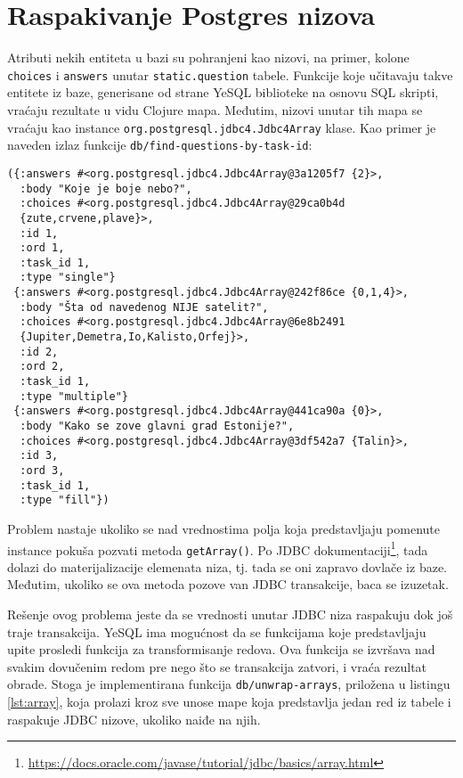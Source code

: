{\section{Raspakivanje Postgres nizova}
Atributi nekih entiteta u bazi su pohranjeni kao nizovi, na primer, kolone \texttt{choices} i \texttt{answers} unutar \texttt{static.question} tabele. Funkcije koje učitavaju takve entitete iz baze, generisane od strane YeSQL biblioteke na osnovu SQL skripti, vraćaju rezultate u vidu Clojure mapa. Međutim, nizovi unutar tih mapa se vraćaju kao instance \texttt{org.postgresql.jdbc4.Jdbc4Array} klase. Kao primer je naveden izlaz funkcije \texttt{db/find-questions-by-task-id}:
\begin{verbatim}
({:answers #<org.postgresql.jdbc4.Jdbc4Array@3a1205f7 {2}>,
  :body "Koje je boje nebo?",
  :choices #<org.postgresql.jdbc4.Jdbc4Array@29ca0b4d
  {zute,crvene,plave}>,
  :id 1,
  :ord 1,
  :task_id 1,
  :type "single"}
 {:answers #<org.postgresql.jdbc4.Jdbc4Array@242f86ce {0,1,4}>,
  :body "Šta od navedenog NIJE satelit?",
  :choices #<org.postgresql.jdbc4.Jdbc4Array@6e8b2491
  {Jupiter,Demetra,Io,Kalisto,Orfej}>,
  :id 2,
  :ord 2,
  :task_id 1,
  :type "multiple"}
 {:answers #<org.postgresql.jdbc4.Jdbc4Array@441ca90a {0}>,
  :body "Kako se zove glavni grad Estonije?",
  :choices #<org.postgresql.jdbc4.Jdbc4Array@3df542a7 {Talin}>,
  :id 3,
  :ord 3,
  :task_id 1,
  :type "fill"})
\end{verbatim}
Problem nastaje ukoliko se nad vrednostima polja koja predstavljaju pomenute instance pokuša pozvati metoda \texttt{getArray()}. Po JDBC dokumentaciji\footnote{\url{https://docs.oracle.com/javase/tutorial/jdbc/basics/array.html}}, tada dolazi do materijalizacije elemenata niza, tj. tada se oni zapravo dovlače iz baze. Međutim, ukoliko se ova metoda pozove van JDBC transakcije, baca se izuzetak.


Rešenje ovog problema jeste da se vrednosti unutar JDBC niza raspakuju dok još traje transakcija. YeSQL ima mogućnost da se funkcijama koje predstavljaju upite prosledi funkcija za transformisanje redova. Ova funkcija se izvršava nad svakim dovučenim redom pre nego što se transakcija zatvori, i vraća rezultat obrade. Stoga je implementirana funkcija \texttt{db/unwrap-arrays}, priložena u listingu \ref{lst:array}, koja prolazi kroz sve unose mape koja predstavlja jedan red iz tabele i raspakuje JDBC nizove, ukoliko naiđe na njih.

}
